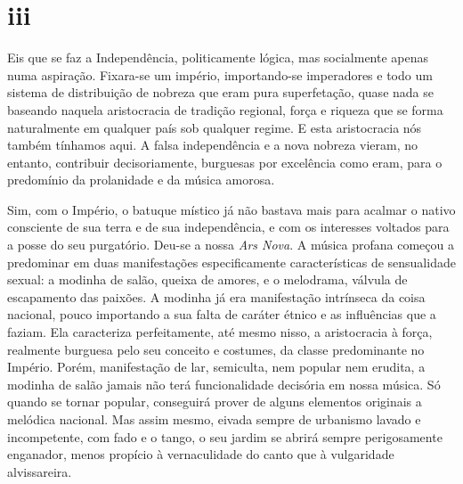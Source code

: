 \section*{iii}

Eis que se faz a Independência, politicamente lógica, mas socialmente
apenas numa aspiração. Fixara-se um império, importando-se imperadores e
todo um sistema de distribuição de nobreza que eram pura superfetação,
quase nada se baseando naquela aristocracia de tradição regional, força
e riqueza que se forma naturalmente em qualquer país sob qualquer
regime. E esta aristocracia nós também tínhamos aqui. A falsa
independência e a nova nobreza vieram, no entanto, contribuir
decisoriamente, burguesas por excelência como eram, para o predomínio da
prolanidade e da música amorosa.

Sim, com o Império, o batuque místico já não bastava mais para acalmar o
nativo consciente de sua terra e de sua independência, e com os
interesses voltados para a posse do seu purgatório. Deu-se a nossa \textit{Ars
Nova}. A música profana começou a predominar em duas manifestações
especificamente características de sensualidade sexual: a modinha de
salão, queixa de amores, e o melodrama, válvula de escapamento das
paixões. A modinha já era manifestação intrínseca da coisa nacional,
pouco importando a sua falta de caráter étnico e as influências que a
faziam. Ela caracteriza perfeitamente, até mesmo nisso, a aristocracia à
força, realmente burguesa pelo seu conceito e costumes, da classe
predominante no Império. Porém, manifestação de lar, semiculta, nem
popular nem erudita, a modinha de salão jamais não terá funcionalidade
decisória em nossa música. Só quando se tornar popular, conseguirá
prover de alguns elementos originais a melódica nacional. Mas assim
mesmo, eivada sempre de urbanismo lavado e incompetente, com fado e o
tango, o seu jardim se abrirá sempre perigosamente enganador, menos
propício à vernaculidade do canto que à vulgaridade alvissareira.

